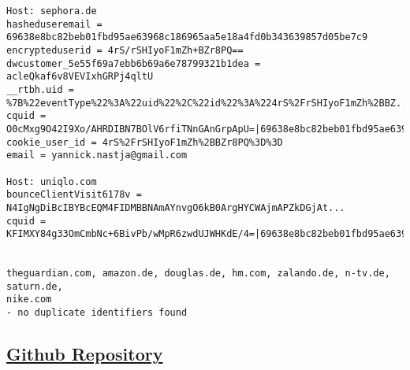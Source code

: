 \begin{verbatim}
Host: sephora.de
hasheduseremail = 69638e8bc82beb01fbd95ae63968c186965aa5e18a4fd0b343639857d05be7c9
encrypteduserid = 4rS/rSHIyoF1mZh+BZr8PQ==
dwcustomer_5e55f69a7ebb6b69a6e78799321b1dea = acleQkaf6v8VEVIxhGRPj4qltU
__rtbh.uid = %7B%22eventType%22%3A%22uid%22%2C%22id%22%3A%224rS%2FrSHIyoF1mZh%2BBZ...
cquid = O0cMxg9O42I9Xo/AHRDIBN7BOlV6rfiTNnGAnGrpApU=|69638e8bc82beb01fbd95ae63968c...
cookie_user_id = 4rS%2FrSHIyoF1mZh%2BBZr8PQ%3D%3D
email = yannick.nastja@gmail.com

Host: uniqlo.com
bounceClientVisit6178v = N4IgNgDiBcIBYBcEQM4FIDMBBNAmAYnvgO6kB0ArgHYCWAjmAPZkDGjAt...
cquid = KFIMXY84g33OmCmbNc+6BivPb/wMpR6zwdUJWHKdE/4=|69638e8bc82beb01fbd95ae63968c...


theguardian.com, amazon.de, douglas.de, hm.com, zalando.de, n-tv.de, saturn.de, 
nike.com
- no duplicate identifiers found
\end{verbatim}
\subsection{\href{https://github.com/ynnickw/seminar-ws23.git}{Github Repository}}